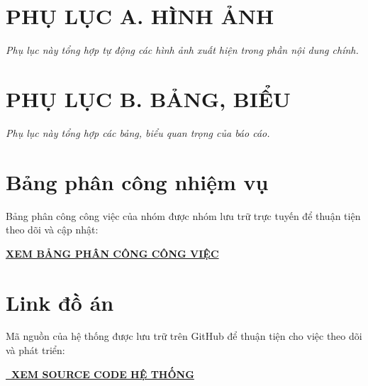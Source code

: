 \documentclass[12pt,a4paper]{article}
\makeatletter
\numberwithin{figure}{subsection}
\numberwithin{table}{subsection}
\newcommand{\appendixnote}[1]{%
    \par\smallskip
    \noindent\textit{#1}
    \par\medskip
}
\newcommand{\printappendixfigures}{\@starttoc{lof}}
\newcommand{\printappendixtables}{\@starttoc{lot}}
\makeatother
\begin{document}
\newpage
\pagestyle{plain}

\clearpage
\section*{PHỤ LỤC A. HÌNH ẢNH}
{}
\appendixnote{Phụ lục này tổng hợp tự động các hình ảnh xuất hiện trong phần nội dung chính.}
\printappendixfigures

\clearpage
\section*{PHỤ LỤC B. BẢNG, BIỂU}
{}
\appendixnote{Phụ lục này tổng hợp các bảng, biểu quan trọng của báo cáo.}
\printappendixtables

\newpage
\section*{Bảng phân công nhiệm vụ}
{}

Bảng phân công công việc của nhóm được nhóm lưu trữ trực tuyến để thuận tiện theo dõi và cập nhật:

\begin{center}
\textbf{\Large
\href{https://docs.google.com/spreadsheets/d/1Cl20GJY18W7uuudsW8dAZPrxM_jM4kr6-J7OUN_MBeI/edit?gid=0}
{XEM BẢNG PHÂN CÔNG CÔNG VIỆC}
}
\end{center}

\hypersetup{
    colorlinks=true,
    urlcolor=blue
}

\section*{Link đồ án}
{}

Mã nguồn của hệ thống được lưu trữ trên GitHub để thuận tiện cho việc theo dõi và phát triển:

\begin{center}
\textbf{\Large
\href{https://github.com/anhminhle26022006-ops/CLINIC-MANAGEMENT-SYSTEM}
{\faGithub\ XEM SOURCE CODE HỆ THỐNG}
}
\end{center}
\end{document}
